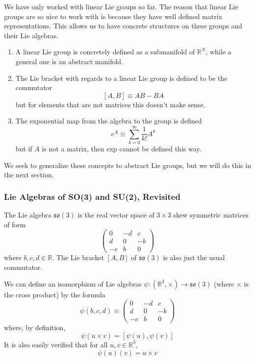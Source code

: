 \documentclass{article}
\begin{document}
    We have only worked with linear Lie groups so far. The reason that linear Lie groups are so nice to work with is because they have well defined matrix representations. This allows us to have concrete structures on these groups and their Lie algebras. 
    \begin{enumerate}
        \item A linear Lie group is concretely defined as a submanifold of $\mathbb{R}^N$, while a general one is an abstract manifold. 
        \item The Lie bracket with regards to a linear Lie group is defined to be the commutator 
        \[[A,B] \equiv A B - B A\]
        but for elements that are not matrices this doesn't make sense. 
        \item The exponential map from the algebra to the group is defined
        \[e^A \equiv \sum_{k=0}^\infty \frac{1}{k!} A^k\]
        but if $A$ is not a matrix, then exp cannot be defined this way.
    \end{enumerate}
    We seek to generalize these concepts to abstract Lie groups, but we will do this in the next section. 

    \subsubsection{Lie Algebras of SO(3) and SU(2), Revisited}

      \begin{example}
      The Lie algebra $\mathfrak{so}(3)$ is the real vector space of $3 \times 3$ skew symmetric matrices of form 
      \[\begin{pmatrix}
      0 & -d & c \\ d & 0 & -b \\ -c & b & 0
      \end{pmatrix}\]
      where $b, c, d \in \mathbb{R}$. The Lie bracket $[A,B]$ of $\mathfrak{so}(3)$ is also just the usual commutator. 

      We can define an isomorphism of Lie algebras $\psi: (\mathbb{R}^3, \times) \longrightarrow \mathfrak{so}(3)$ (where $\times$ is the cross product) by the formula 
      \[\psi(b, c, d) \equiv \begin{pmatrix}
      0 & -d & c \\
      d & 0 & -b \\
      -c & b & 0
      \end{pmatrix}\]
      where, by definition, 
      \[\psi(u \times v) = [\psi(u), \psi(v)]\]
      It is also easily verified that for all $u, v \in \mathbb{R}^3$, 
      \[\psi(u) (v) = u \times v\]
      \end{example}
\end{document}
